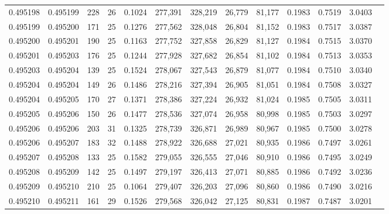 \begin{tabular}{rrrrrrrrrrrrr}
0.495198 & 0.495199 & 228 &  26 &                                     0.1024 & 277,391 & 328,219 &  26,779 &  81,177 & 0.1983 & 0.7519 & 3.0403 \\
0.495199 & 0.495200 & 171 &  25 &                                     0.1276 & 277,562 & 328,048 &  26,804 &  81,152 & 0.1983 & 0.7517 & 3.0387 \\
0.495200 & 0.495201 & 190 &  25 &                                     0.1163 & 277,752 & 327,858 &  26,829 &  81,127 & 0.1984 & 0.7515 & 3.0370 \\
0.495201 & 0.495203 & 176 &  25 &                                     0.1244 & 277,928 & 327,682 &  26,854 &  81,102 & 0.1984 & 0.7513 & 3.0353 \\
0.495203 & 0.495204 & 139 &  25 &                                     0.1524 & 278,067 & 327,543 &  26,879 &  81,077 & 0.1984 & 0.7510 & 3.0340 \\
0.495204 & 0.495204 & 149 &  26 &                                     0.1486 & 278,216 & 327,394 &  26,905 &  81,051 & 0.1984 & 0.7508 & 3.0327 \\
0.495204 & 0.495205 & 170 &  27 &                                     0.1371 & 278,386 & 327,224 &  26,932 &  81,024 & 0.1985 & 0.7505 & 3.0311 \\
0.495205 & 0.495206 & 150 &  26 &                                     0.1477 & 278,536 & 327,074 &  26,958 &  80,998 & 0.1985 & 0.7503 & 3.0297 \\
0.495206 & 0.495206 & 203 &  31 &                                     0.1325 & 278,739 & 326,871 &  26,989 &  80,967 & 0.1985 & 0.7500 & 3.0278 \\
0.495206 & 0.495207 & 183 &  32 &                                     0.1488 & 278,922 & 326,688 &  27,021 &  80,935 & 0.1986 & 0.7497 & 3.0261 \\
0.495207 & 0.495208 & 133 &  25 &                                     0.1582 & 279,055 & 326,555 &  27,046 &  80,910 & 0.1986 & 0.7495 & 3.0249 \\
0.495208 & 0.495209 & 142 &  25 &                                     0.1497 & 279,197 & 326,413 &  27,071 &  80,885 & 0.1986 & 0.7492 & 3.0236 \\
0.495209 & 0.495210 & 210 &  25 &                                     0.1064 & 279,407 & 326,203 &  27,096 &  80,860 & 0.1986 & 0.7490 & 3.0216 \\
0.495210 & 0.495211 & 161 &  29 &                                     0.1526 & 279,568 & 326,042 &  27,125 &  80,831 & 0.1987 & 0.7487 & 3.0201 \\

\end{tabular}
